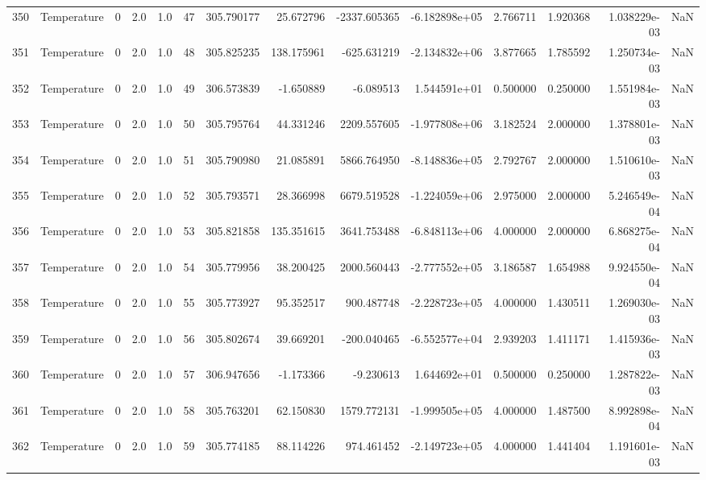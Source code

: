 \begin{tabular}{llrrrrrrrrrrrr}
350 &  Temperature &       0 &  2.0 &  1.0 &   47 &  305.790177 &    25.672796 &   -2337.605365 & -6.182898e+05 &  2.766711 &  1.920368 &  1.038229e-03 &      NaN \\
351 &  Temperature &       0 &  2.0 &  1.0 &   48 &  305.825235 &   138.175961 &    -625.631219 & -2.134832e+06 &  3.877665 &  1.785592 &  1.250734e-03 &      NaN \\
352 &  Temperature &       0 &  2.0 &  1.0 &   49 &  306.573839 &    -1.650889 &      -6.089513 &  1.544591e+01 &  0.500000 &  0.250000 &  1.551984e-03 &      NaN \\
353 &  Temperature &       0 &  2.0 &  1.0 &   50 &  305.795764 &    44.331246 &    2209.557605 & -1.977808e+06 &  3.182524 &  2.000000 &  1.378801e-03 &      NaN \\
354 &  Temperature &       0 &  2.0 &  1.0 &   51 &  305.790980 &    21.085891 &    5866.764950 & -8.148836e+05 &  2.792767 &  2.000000 &  1.510610e-03 &      NaN \\
355 &  Temperature &       0 &  2.0 &  1.0 &   52 &  305.793571 &    28.366998 &    6679.519528 & -1.224059e+06 &  2.975000 &  2.000000 &  5.246549e-04 &      NaN \\
356 &  Temperature &       0 &  2.0 &  1.0 &   53 &  305.821858 &   135.351615 &    3641.753488 & -6.848113e+06 &  4.000000 &  2.000000 &  6.868275e-04 &      NaN \\
357 &  Temperature &       0 &  2.0 &  1.0 &   54 &  305.779956 &    38.200425 &    2000.560443 & -2.777552e+05 &  3.186587 &  1.654988 &  9.924550e-04 &      NaN \\
358 &  Temperature &       0 &  2.0 &  1.0 &   55 &  305.773927 &    95.352517 &     900.487748 & -2.228723e+05 &  4.000000 &  1.430511 &  1.269030e-03 &      NaN \\
359 &  Temperature &       0 &  2.0 &  1.0 &   56 &  305.802674 &    39.669201 &    -200.040465 & -6.552577e+04 &  2.939203 &  1.411171 &  1.415936e-03 &      NaN \\
360 &  Temperature &       0 &  2.0 &  1.0 &   57 &  306.947656 &    -1.173366 &      -9.230613 &  1.644692e+01 &  0.500000 &  0.250000 &  1.287822e-03 &      NaN \\
361 &  Temperature &       0 &  2.0 &  1.0 &   58 &  305.763201 &    62.150830 &    1579.772131 & -1.999505e+05 &  4.000000 &  1.487500 &  8.992898e-04 &      NaN \\
362 &  Temperature &       0 &  2.0 &  1.0 &   59 &  305.774185 &    88.114226 &     974.461452 & -2.149723e+05 &  4.000000 &  1.441404 &  1.191601e-03 &      NaN \\

\end{tabular}

